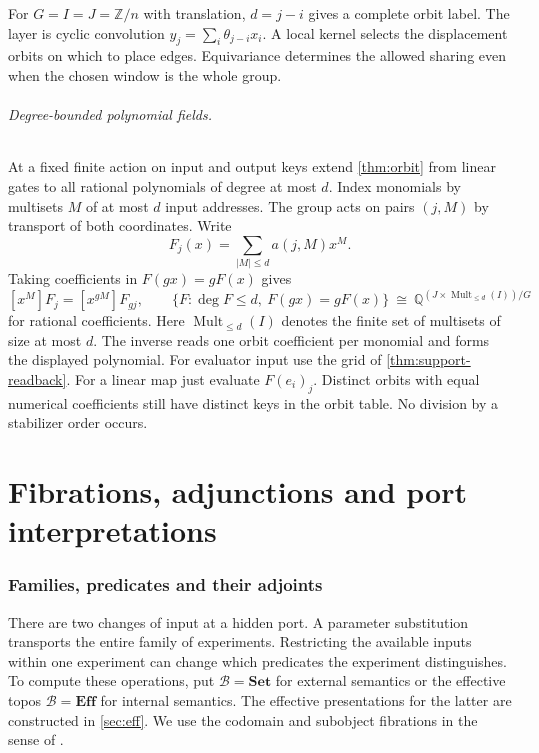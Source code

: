 \documentclass[11pt,a4paper]{article}
\theoremstyle{definition}
\theoremstyle{remark}\newaliascnt{remark}{theorem}
\newcommand{\E}{\mathbf{Eff}}
\newcommand{\Q}{\mathbb Q}
\numberwithin{equation}{section}
\begin{document}
For $G=I=J=\mathbb Z/n$ with translation, $d=j-i$ gives a complete orbit label. The layer is cyclic convolution $y_j=\sum_i\theta_{j-i}x_i$. A local kernel selects the displacement orbits on which to place edges. Equivariance determines the allowed sharing even when the chosen window is the whole group.

\paragraph{Degree-bounded polynomial fields.}
At a fixed finite action on input and output keys extend \cref{thm:orbit} from linear gates to all rational polynomials of degree at most $d$. Index monomials by multisets $M$ of at most $d$ input addresses. The group acts on pairs $(j,M)$ by transport of both coordinates. Write
\[
 F_j(x)=\sum_{|M|\le d}a(j,M)x^M.
\]
Taking coefficients in \(F(gx)=gF(x)\) gives
\[
 [x^M]F_j=[x^{gM}]F_{gj},\qquad
 \{F:\deg F\le d,\ F(gx)=gF(x)\}
    \ \cong\ \Q^{(J\times\operatorname{Mult}_{\le d}(I))/G}
\]
for rational coefficients. Here \(\operatorname{Mult}_{\le d}(I)\) denotes the finite set of multisets of size at most \(d\). The inverse reads one orbit coefficient per monomial and forms the displayed polynomial. For evaluator input use the grid of \cref{thm:support-readback}. For a linear map just evaluate \(F(e_i)_j\). Distinct orbits with equal numerical coefficients still have distinct keys in the orbit table. No division by a stabilizer order occurs.


\clearpage
\part{Fibrations, adjunctions and port interpretations}\label{part:ports}

\section{Families, predicates and their adjoints}\label{sec:indexed-readback}

There are two changes of input at a hidden port. A parameter substitution transports the entire family of experiments. Restricting the available inputs within one experiment can change which predicates the experiment distinguishes. To compute these operations, put \(\mathcal B=\mathbf{Set}\) for external semantics or the effective topos \(\mathcal B=\E\) for internal semantics. The effective presentations for the latter are constructed in \cref{sec:eff}. We use the codomain and subobject fibrations in the sense of \cite{jacobs-fibrations}.
\end{document}
